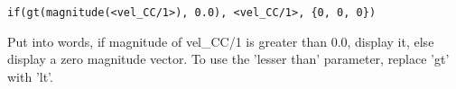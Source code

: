 \begin{verbatim}
if(gt(magnitude(<vel_CC/1>), 0.0), <vel_CC/1>, {0, 0, 0})
\end{verbatim}

Put into words, if magnitude of vel\_CC/1 is greater than 0.0, display it, else display a zero magnitude vector. To use the 'lesser than' parameter, replace 'gt' with 'lt'.








